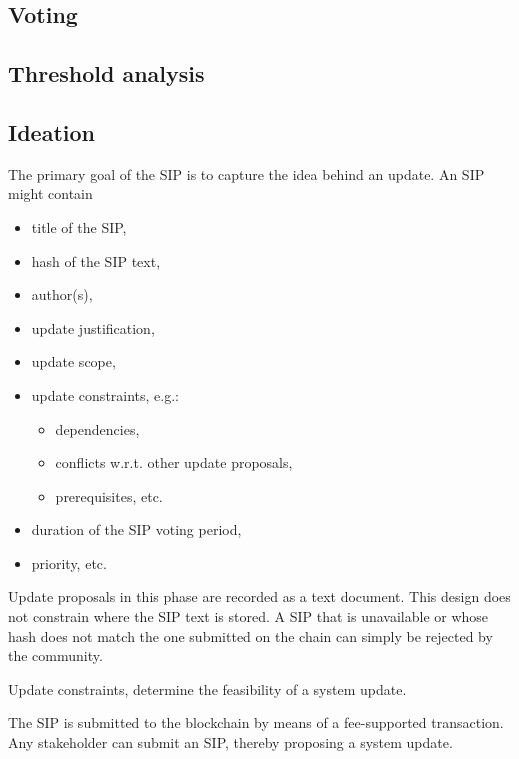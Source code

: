 \documentclass[11pt,a4paper]{article}
\begin{document}
\subsection{Voting}
\label{sec:voting}


\subsection{Threshold analysis}
\label{sec:threshold-analysis}

\subsection{Ideation}
\label{sec:ideation}

The primary goal of the SIP is to capture the idea behind an update.
An SIP might contain
\begin{itemize}
\item title of the SIP,
\item hash of the SIP text,
\item author(s),
\item update justification,
\item update scope,
\item update constraints, e.g.:
  \begin{itemize}
  \item dependencies,
  \item conflicts w.r.t. other update proposals,
  \item prerequisites, etc.
  \end{itemize}
\item duration of the SIP voting period,
\item priority, etc.
\end{itemize}

Update proposals in this phase are recorded as a text document.
This design does not constrain where the SIP text is stored. A SIP that is
unavailable or whose hash does not match the one submitted on the chain can
simply be rejected by the community.

Update constraints, determine the feasibility of a system update.

The SIP is submitted to the blockchain by means of a fee-supported transaction.
Any stakeholder can submit an SIP, thereby proposing a system update.
\end{document}
